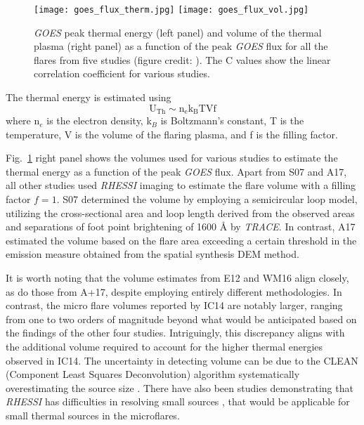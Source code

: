 \begin{figure}[ht!]
    \centering
    \texttt{[image: goes\_flux\_therm.jpg]}
    \texttt{[image: goes\_flux\_vol.jpg]}
    \caption[Correlation of peak {\it GOES} flux with peak thermal energy and flaring plasma volume.]{{\it GOES} peak thermal energy (left panel) and volume of the thermal plasma (right panel) as a function of the peak {\it GOES} flux for all the flares from five studies (figure credit: \cite{warmuth20}). The C values show the linear correlation coefficient for various studies.}
    \label{fig:goes-therm}
\end{figure}

The thermal energy is estimated using $$\mathrm{U_{Th}\sim n_{e}k_{B}TVf}$$
\noindent where n$_e$ is the electron density, k$_B$ is Boltzmann's constant, T is the temperature, V is the volume of the flaring plasma, and f is the filling factor.

 Fig.~\ref{fig:goes-therm} right panel shows the volumes used for various studies to estimate the thermal energy as a function of the peak {\it GOES} flux. Apart from S07 and A17, all other studies used {\it RHESSI} imaging to estimate the flare volume with a filling factor $f=1$. S07 determined the volume by employing a semicircular loop model, utilizing the cross-sectional area and loop length derived from the observed areas and separations of foot point brightening of 1600  {\AA} by {\it TRACE}. In contrast, A17 estimated the volume based on the flare area exceeding a certain threshold in the emission measure obtained from the spatial synthesis DEM method. 

It is worth noting that the volume estimates from E12 and WM16 align closely, as do those from A+17, despite employing entirely different methodologies. In contrast, the micro flare volumes reported by IC14 are notably larger, ranging from one to two orders of magnitude beyond what would be anticipated based on the findings of the other four studies. Intriguingly, this discrepancy aligns with the additional volume required to account for the higher thermal energies observed in IC14. The uncertainty in detecting volume can be due to the CLEAN (Component Least Squares Deconvolution) algorithm systematically overestimating the source size \citep{warmuth13a}. There have also been studies demonstrating that {\it RHESSI} has difficulties in resolving small sources \citep{dennis09,warmuth13b}, that would be applicable for small thermal sources in the microflares. %

